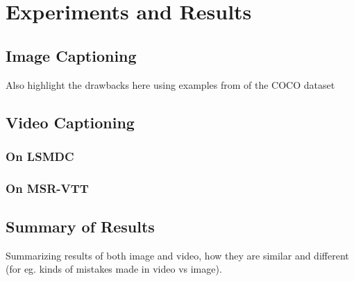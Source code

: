 \chapter{Experiments and Results}
\label{chapter:results}

\section{Image Captioning}
Also highlight the drawbacks here using examples from of the COCO dataset

\section{Video Captioning}
\subsection{On LSMDC}
\subsection{On MSR-VTT}
\section{Summary of Results}
Summarizing results of both image and video, how they are similar and different
(for eg. kinds of mistakes made in video vs image).
